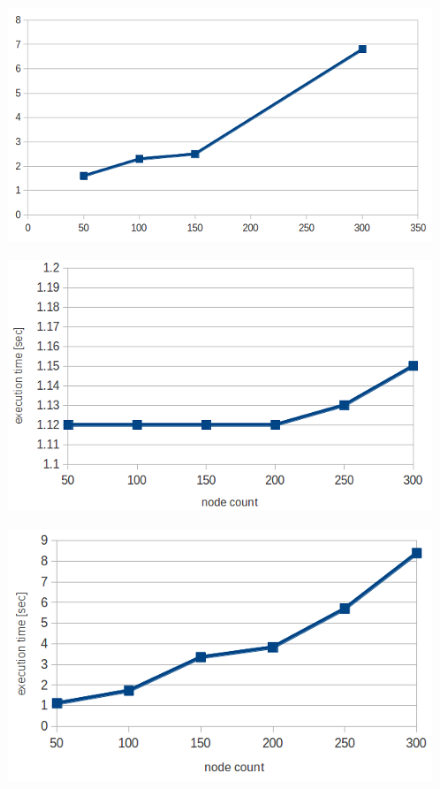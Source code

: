 \documentclass[DM,toc]{lsstdoc}
\begin{document}
\begin{figure}
	\includegraphics[width=\textwidth]{f1}
	\caption{}
	\label{fig:1}
\end{figure}

\begin{figure}
	\includegraphics[width=\textwidth]{f2}
	\caption{}
	\label{fig:2}
\end{figure}

\begin{figure}
	\includegraphics[width=\textwidth]{f3}
	\caption{}
	\label{fig:3}
\end{figure}
\end{document}
